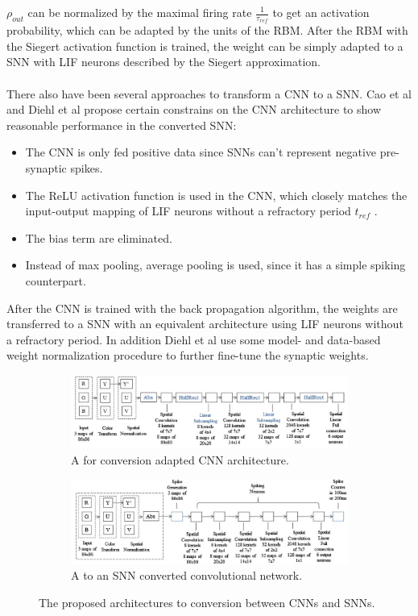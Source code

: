$\rho_{out}$ can be normalized by the maximal firing rate $\frac{1}{\tau_{ref}}$ to get an activation probability, which can be adapted by the units of the RBM. 
After the RBM with the Siegert activation function is trained, the weight can be simply adapted to a SNN with LIF neurons described by the Siegert approximation.
\\
\\
There also have been several approaches to transform a CNN to a SNN.  
Cao et al and Diehl et al propose certain constrains on the CNN architecture to show reasonable performance in the converted SNN:
\begin{itemize}
\item The CNN is only fed positive data since SNNs can't represent negative pre-synaptic spikes. 
\item The ReLU activation function is used in the CNN, which closely matches the input-output mapping of LIF neurons without a refractory period $t_{ref}$ .
\item The bias term are eliminated.
\item Instead of max pooling, average pooling is used, since it has a simple spiking counterpart.
\end{itemize}
After the CNN is trained with the back propagation algorithm, the weights are transferred to a SNN with an equivalent architecture using LIF neurons without a refractory period. 
In addition Diehl et al use some model- and data-based weight normalization procedure to further fine-tune the synaptic weights. 

\begin{figure}
	\centering
	\begin{subfigure}[t]{.50\textwidth}
  		\centering
  		\includegraphics[width=.9\linewidth]{imgs/cnn_snn_conv1.jpg}
  		\caption{A for conversion adapted CNN architecture.}
  		\label{fig:sub1}
	\end{subfigure}%
	\begin{subfigure}[t]{.50\textwidth}
  		\centering
  		\includegraphics[width=.9\linewidth]{imgs/cnn_snn_conv2.jpg}
  		\caption{A to an SNN converted convolutional network.}
  		\label{fig:sub2}
	\end{subfigure}
	\caption{The proposed architectures to conversion between CNNs and SNNs. }
\end{figure}

